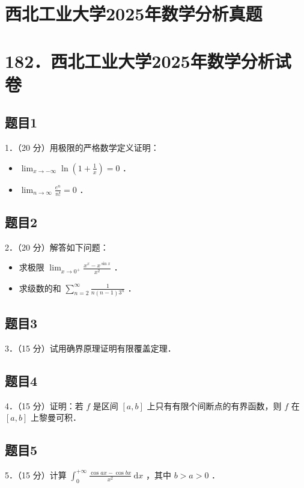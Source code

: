 \documentclass{article}
\begin{document}
\section*{西北工业大学2025年数学分析真题}
\section*{182．西北工业大学2025年数学分析试卷}

\subsection{题目1}
1．（20 分）用极限的严格数学定义证明：

\begin{itemize}
  \item[（1）] \(\lim _{x \rightarrow-\infty} \ln \left(1+\frac{1}{x}\right)=0\) ．
  \item[（2）] \(\lim _{n \rightarrow \infty} \frac{e^{n}}{n!}=0\) ．
\end{itemize}

\subsection{题目2}
2．（20 分）解答如下问题：

\begin{itemize}
  \item[（1）] 求极限 \(\lim _{x \rightarrow 0^{+}} \frac{x^{x}-x^{\sin x}}{x^{2}}\) ．
  \item[（2）] 求级数的和 \(\sum_{n=2}^{\infty} \frac{1}{n(n-1) 3^{n}}\) ．
\end{itemize}

\subsection{题目3}
3．（15 分）试用确界原理证明有限覆盖定理．

\subsection{题目4}
4．（15 分）证明：若 \(f\) 是区间 \([a, b]\) 上只有有限个间断点的有界函数，则 \(f\) 在 \([a, b]\) 上黎曼可积．

\subsection{题目5}
5．（15 分）计算 \(\int_{0}^{+\infty} \frac{\cos a x-\cos b x}{x^{2}} \mathrm{~d} x\) ，其中 \(b>a>0\) ．
\end{document}
